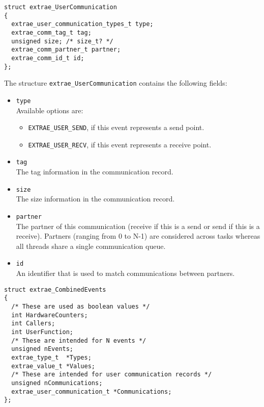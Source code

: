\begin{verbatim}
struct extrae_UserCommunication
{
  extrae_user_communication_types_t type;
  extrae_comm_tag_t tag;
  unsigned size; /* size_t? */
  extrae_comm_partner_t partner;
  extrae_comm_id_t id;
};
\end{verbatim}

The structure {\tt extrae\_UserCommunication} contains the following fields:
\begin{itemize}
	\item {\tt type}\\
	Available options are:
	\begin{itemize}
		\item {\tt EXTRAE\_USER\_SEND}, if this event represents a send point.
		\item {\tt EXTRAE\_USER\_RECV}, if this event represents a receive point.
	\end{itemize}
	\item {\tt tag}\\
	The tag information in the communication record. 
	\item {\tt size}\\
	The size information in the communication record.
	\item {\tt partner}\\
	The partner of this communication (receive if this is a send or send if this is a receive). Partners (ranging from 0 to N-1) are considered across tasks whereas all threads share a single communication queue.
	\item {\tt id}\\
	An identifier that is used to match communications between partners.
\end{itemize}

\begin{verbatim}
struct extrae_CombinedEvents
{
  /* These are used as boolean values */
  int HardwareCounters;
  int Callers;
  int UserFunction;
  /* These are intended for N events */
  unsigned nEvents;
  extrae_type_t  *Types;
  extrae_value_t *Values;
  /* These are intended for user communication records */
  unsigned nCommunications;
  extrae_user_communication_t *Communications;
};
\end{verbatim}

